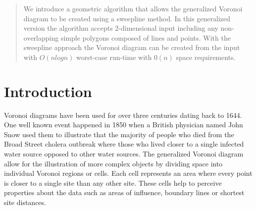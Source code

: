\documentclass{egpubl}
\begin{document}
\maketitle

\begin{abstract}
We introduce a geometric algorithm that allows the generalized Voronoi diagram to be created using a sweepline method. In this generalized version the algorithm accepts 2-dimensional input including any non-overlapping simple polygons composed of lines and points. With the sweepline approach the Voronoi diagram can be created from the input with $O(n logn)$ worst-case run-time with $0(n)$ space requirements. 


\begin{classification} %
\end{classification}

\end{abstract}


\section{Introduction}
\label{sec:intro}

Voronoi diagrams have been used for over three centuries dating back to 1644. One well known event happened in 1850 when a British physician named John Snow used them to illustrate that the majority of people who died from the Broad Street cholera outbreak where those who lived closer to a single infected water source opposed to other water sources. The generalized Voronoi diagram allow for the illustration of more complex objects by dividing space into individual Voronoi regions or cells. Each cell represents an area where every point is closer to a single site than any other site. These cells help to perceive properties about the data such as areas of influence, boundary lines or shortest site distances. 	
\end{document}
